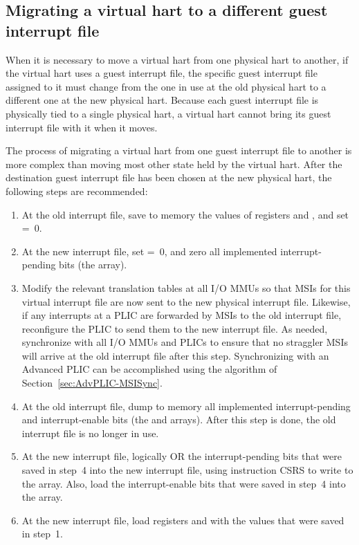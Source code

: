 \subsection{Migrating a virtual hart to a different guest interrupt file}
\label{sec:virtHartMigration}

When it is necessary to move a virtual hart from one physical hart to
another, if the virtual hart uses a guest interrupt file, the specific
guest interrupt file assigned to it must change from the one in use at
the old physical hart to a different one at the new physical hart.
Because each guest interrupt file is physically tied to a single
physical hart, a virtual hart cannot bring its guest interrupt file
with it when it moves.

The process of migrating a virtual hart from one guest interrupt file
to another is more complex than moving most other state held by the
virtual hart.
After the destination guest interrupt file has been chosen at the new
physical hart, the following steps are recommended:
\begin{enumerate}

\item
At the old interrupt file, save to memory the values of registers
 and , and set  =~0.

\item
At the new interrupt file, set  =~0, and zero all
implemented interrupt-pending bits (the  array).

\item
Modify the relevant translation tables at all I/O MMUs so that MSIs for
this virtual interrupt file are now sent to the new physical interrupt
file.
Likewise, if any interrupts at a PLIC are forwarded by MSIs to the old
interrupt file, reconfigure the PLIC to send them to the new interrupt
file.
As needed, synchronize with all I/O MMUs and PLICs to ensure that no
straggler MSIs will arrive at the old interrupt file after this step.
Synchronizing with an Advanced PLIC can be accomplished using the
algorithm of Section~\ref{sec:AdvPLIC-MSISync}.

\item
At the old interrupt file, dump to memory all implemented
interrupt-pending and interrupt-enable bits (the  and 
arrays).
After this step is done, the old interrupt file is no longer in use.

\item
At the new interrupt file, logically OR the interrupt-pending bits that
were saved in step~4 into the new interrupt file, using instruction
CSRS to write to the  array.
Also, load the interrupt-enable bits that were saved in step~4 into the
 array.

\item
At the new interrupt file, load registers  and
 with the values that were saved in step~1.

\end{enumerate}

